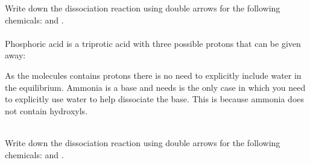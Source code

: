 \documentclass[main.tex]{subfiles}
\begin{document}
\begin{description}











\begin{example} %
Write down the dissociation reaction using double arrows for the following chemicals:  and .
\\
\\
Phosphoric acid is a triprotic acid with three possible protons that can be given away:
\begin{center}\end{center}
As the molecules contains protons there is no need to explicitly include water in the equilibrium. Ammonia is a base and needs is the only case in which you need to explicitly use water to help dissociate the base. This is because ammonia does not contain hydroxyls.
\begin{center}\end{center}
\faDiamond\ \\
Write down the dissociation reaction using double arrows for the following chemicals:  and .
\\
\end{example}%


\end{description}
\end{document}
